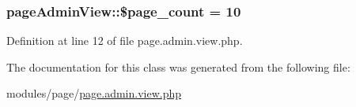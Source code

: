 \hypertarget{classpageAdminView_a326ed8f2249c47efa48b3fe781e11fa4}{
\subsubsection[{\$page\+\_\+count}]{\setlength{\rightskip}{0pt plus 5cm}page\+Admin\+View\+::\$page\+\_\+count = 10}}\label{classpageAdminView_a326ed8f2249c47efa48b3fe781e11fa4}


Definition at line 12 of file page.\+admin.\+view.\+php.



The documentation for this class was generated from the following file\+:\begin{DoxyCompactItemize}
\item 
modules/page/\hyperlink{page_8admin_8view_8php}{page.\+admin.\+view.\+php}\end{DoxyCompactItemize}
